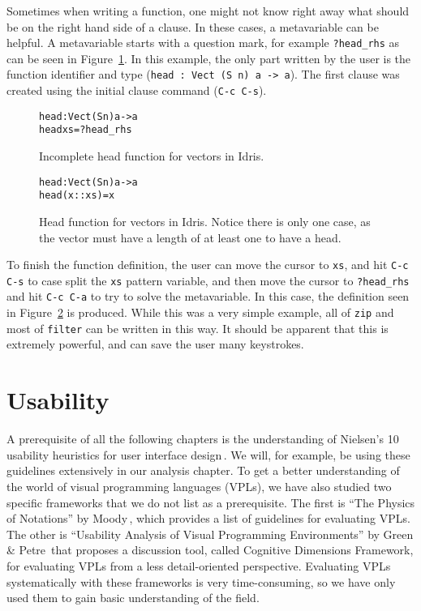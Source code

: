 Sometimes when writing a function, one might not know right away what should be on the right hand side of a clause.
In these cases, a metavariable can be helpful. A metavariable starts with a question mark, for example \texttt{?head\_rhs} as can be seen in Figure~\ref{fig:incomplete_head}.
In this example, the only part written by the user is the function identifier and type (\texttt{head : Vect (S n) a -> a}).
The first clause was created using the initial clause command (\texttt{C-c C-s}).

\begin{figure}[ht]
\begin{alltt}
head : Vect (S n) a -> a
head xs = ?head_rhs
\end{alltt}
\caption{Incomplete head function for vectors in Idris.}
\label{fig:incomplete_head}
\end{figure}

\begin{figure}[ht]
\begin{alltt}
head : Vect (S n) a -> a
head (x :: xs) = x
\end{alltt}
\caption{Head function for vectors in Idris. Notice there is only one case, as the vector must have a length of at least one to have a head.}
\label{fig:head}
\end{figure}

To finish the function definition, the user can move the cursor to \texttt{xs}, and hit \texttt{C-c C-s} to case split the \texttt{xs} pattern variable, and then move the cursor to \texttt{?head\_rhs} and hit \texttt{C-c C-a} to try to solve the metavariable.
In this case, the definition seen in Figure~\ref{fig:head} is produced.
While this was a very simple example, all of \texttt{zip} and most of \texttt{filter} can be written in this way.
It should be apparent that this is extremely powerful, and can save the user many keystrokes.

\section{Usability}
A prerequisite of all the following chapters is the understanding of Nielsen's
10 usability heuristics for user interface design\,\cite{nielsen1990heuristic}.
We will, for example, be using these guidelines extensively in our analysis chapter.
To get a better understanding of the world of visual programming languages (VPLs), we
have also studied two specific frameworks that we do not list as a
prerequisite. The first is ``The Physics of Notations'' by Moody\,\cite{Moody:2009:NTS:1687047.1687149},
which provides a list of guidelines for evaluating VPLs. The other is ``Usability Analysis of Visual Programming Environments''
by Green \& Petre\,\cite{Green96usabilityanalysis} that proposes a discussion
tool, called Cognitive Dimensions Framework, for evaluating VPLs from a less
detail-oriented perspective. Evaluating VPLs systematically with these frameworks is very time-consuming, so we have
only used them to gain basic understanding of the field.





